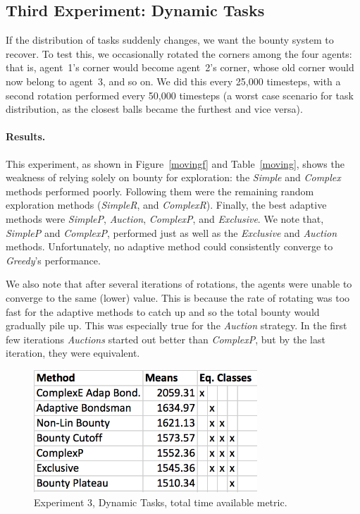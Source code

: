 \documentclass[letterpaper]{aamas2015}
\newcommand\paragrapha[1]{\paragraph*{{#1}.}}
\newcommand\bump{\vspace{10in}}
\begin{document}
\subsection{Third Experiment: Dynamic Tasks}
If the distribution of tasks suddenly changes, we want the bounty system to recover.  To test this, we occasionally rotated the corners among the four agents: that is, agent~1's corner would become agent~2's corner, whose old corner would now belong to agent~3, and so on.  We did this every 25,000 timesteps, with a second rotation performed every 50,000 timesteps (a worst case scenario for task distribution, as the closest balls became the furthest and vice versa).

\paragrapha{Results}
This experiment, as shown in Figure~\ref{movingf} and Table~\ref{moving}, shows the weakness of relying solely on bounty for exploration: the \textit{Simple} and \textit{Complex} methods performed poorly.  Following them were the remaining random exploration methods (\textit{SimpleR}, and \textit{ComplexR}). Finally, the best adaptive methods were \textit{SimpleP}, \textit{Auction}, \textit{ComplexP}, and \textit{Exclusive}. We note that, \textit{SimpleP} and \textit{ComplexP}, performed just as well as the  \textit{Exclusive} and  \textit{Auction} methods. Unfortunately, no adaptive method could consistently converge to \textit{Greedy}'s performance.



We also note that after several iterations of rotations, the agents were unable to converge to the same (lower) value.  This is because the rate of rotating was too fast for the adaptive methods to catch up and so the total bounty would gradually pile up. This was especially true for the \textit{Auction} strategy.  In the first few iterations \textit{Auctions} started out better than \textit{ComplexP}, but by the last iteration, they were equivalent.

\begin{figure}[t]
\begin{center}\includegraphics[width=3.3in]{rotT.png}\end{center}
\vspace{-0.5em}\caption{Experiment 3, Dynamic Tasks, total time available metric.}
\label{rotT}
\end{figure}
\end{document}
